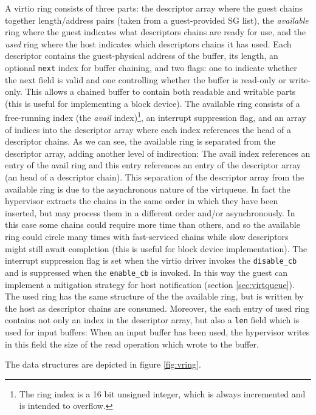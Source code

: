 A virtio ring consists of three parts: the descriptor array where the guest chains together length/address pairs (taken from a guest-provided
SG list), the \emph{available} ring where the guest indicates what descriptors chains are ready for use, and the \emph{used} ring where the
host indicates which descriptors chains it has used. Each descriptor contains the guest-physical address of the buffer, its length, an 
optional \texttt{next} index for buffer chaining, and two flags: one to indicate whether the next field is valid and one controlling 
whether the buffer is read-only or write-only. This allows a chained buffer to contain both readable and writable parts (this is 
useful for implementing a block device).
The available ring consists of a free-running index (the \emph{avail} index)\footnote{The ring index is a 16 bit unsigned integer, 
which is always incremented and is intended to overflow.}, an interrupt suppression flag, and an array of indices into the descriptor array 
where each index references the head of a descriptor chains. As we can see, the available ring is separated from the descriptor array, 
adding another level of indirection: The avail index references an entry of the avail ring and this entry references an entry of the
descriptor array (an head of a descriptor chain).
This separation of the descriptor array from the available ring is due to the asynchronous nature of the virtqueue. In fact the hypervisor
extracts the chains in the same order in which they have been inserted, but may process them in a different order and/or asynchronously.
In this case some chains could require more time than others, and so the available ring could circle many times with fast-serviced
chains while slow descriptors might still await completion (this is useful for block device implementation).
The interrupt suppression flag is set when the virtio driver invokes the \texttt{disable\_cb} and is suppressed when the
\texttt{enable\_cb} is invoked. In this way the guest can implement a mitigation strategy for host notification (section 
\ref{sec:virtqueue}).
The used ring has the same structure of the the available ring, but is written by the host as descriptor chains are consumed. Moreover,
the each entry of used ring contains not only an index in the descriptor array, but also a \texttt{len} field which is used for input
buffers: When an input buffer has been used, the hypervisor writes in this field the size of the read operation which wrote to the buffer.

The data structures are depicted in figure \ref{fig:vring}.


